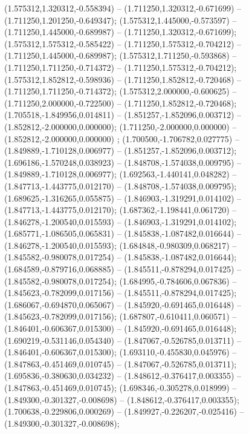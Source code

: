  (1.575312,1.320312,-0.558394) -- (1.711250,1.320312,-0.671699) -- (1.711250,1.201250,-0.649347);
 (1.575312,1.445000,-0.573597) -- (1.711250,1.445000,-0.689987) -- (1.711250,1.320312,-0.671699);
 (1.575312,1.575312,-0.585422) -- (1.711250,1.575312,-0.704212) -- (1.711250,1.445000,-0.689987);
 (1.575312,1.711250,-0.593868) -- (1.711250,1.711250,-0.714372) -- (1.711250,1.575312,-0.704212);
 (1.575312,1.852812,-0.598936) -- (1.711250,1.852812,-0.720468) -- (1.711250,1.711250,-0.714372);
 (1.575312,2.000000,-0.600625) -- (1.711250,2.000000,-0.722500) -- (1.711250,1.852812,-0.720468);
 (1.705518,-1.849956,0.014811) -- (1.851257,-1.852096,0.003712) -- (1.852812,-2.000000,0.000000);
 (1.711250,-2.000000,0.000000) -- (1.852812,-2.000000,0.000000) ;
 (1.700500,-1.706782,0.027775) -- (1.849889,-1.710128,0.006977) -- (1.851257,-1.852096,0.003712);
 (1.696186,-1.570248,0.038923) -- (1.848708,-1.574038,0.009795) -- (1.849889,-1.710128,0.006977);
 (1.692563,-1.440141,0.048282) -- (1.847713,-1.443775,0.012170) -- (1.848708,-1.574038,0.009795);
 (1.689625,-1.316265,0.055875) -- (1.846903,-1.319291,0.014102) -- (1.847713,-1.443775,0.012170);
 (1.687362,-1.198441,0.061720) -- (1.846278,-1.200540,0.015593) -- (1.846903,-1.319291,0.014102);
 (1.685771,-1.086505,0.065831) -- (1.845838,-1.087482,0.016644) -- (1.846278,-1.200540,0.015593);
 (1.684848,-0.980309,0.068217) -- (1.845582,-0.980078,0.017254) -- (1.845838,-1.087482,0.016644);
 (1.684589,-0.879716,0.068885) -- (1.845511,-0.878294,0.017425) -- (1.845582,-0.980078,0.017254);
 (1.684995,-0.784606,0.067836) -- (1.845623,-0.782099,0.017156) -- (1.845511,-0.878294,0.017425);
 (1.686067,-0.694870,0.065067) -- (1.845920,-0.691465,0.016448) -- (1.845623,-0.782099,0.017156);
 (1.687807,-0.610411,0.060571) -- (1.846401,-0.606367,0.015300) -- (1.845920,-0.691465,0.016448);
 (1.690219,-0.531146,0.054340) -- (1.847067,-0.526785,0.013711) -- (1.846401,-0.606367,0.015300);
 (1.693110,-0.455830,0.045976) -- (1.847863,-0.451469,0.010745) -- (1.847067,-0.526785,0.013711);
 (1.695836,-0.380630,0.034232) -- (1.848612,-0.376417,0.003355) -- (1.847863,-0.451469,0.010745);
 (1.698346,-0.305278,0.018999) -- (1.849300,-0.301327,-0.008698) -- (1.848612,-0.376417,0.003355);
 (1.700638,-0.229806,0.000269) -- (1.849927,-0.226207,-0.025416) -- (1.849300,-0.301327,-0.008698);
